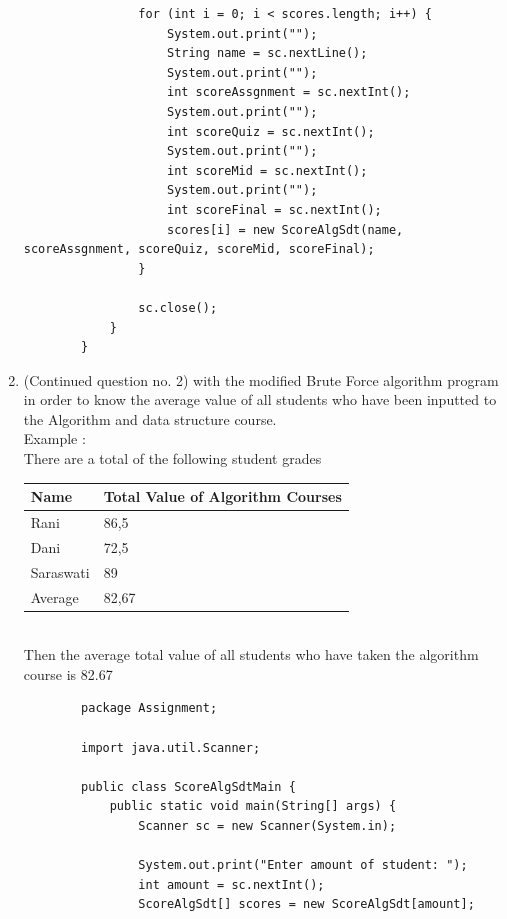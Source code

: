 \documentclass[12pt,titlepage]{article}
\begin{document}
\begin{enumerate}
\begin{verbatim}
                for (int i = 0; i < scores.length; i++) {
                    System.out.print("");
                    String name = sc.nextLine();
                    System.out.print("");
                    int scoreAssgnment = sc.nextInt();
                    System.out.print("");
                    int scoreQuiz = sc.nextInt();
                    System.out.print("");
                    int scoreMid = sc.nextInt();
                    System.out.print("");
                    int scoreFinal = sc.nextInt();
                    scores[i] = new ScoreAlgSdt(name, scoreAssgnment, scoreQuiz, scoreMid, scoreFinal);
                }

                sc.close();
            }
        }
    \end{verbatim}
    \item (Continued question no. 2) with the modified Brute Force algorithm program in order to know the average value of all students who have been inputted to the Algorithm and data structure course. \mbox{}\\
    Example : \mbox{}\\
    There are a total of the following student grades
    \mbox{}\\
    \begin{tabular}{|l|l|}
        \hline
        Name & Total Value of Algorithm Courses \\
        \hline
        Rani & 86,5 \\
        \hline
        Dani & 72,5 \\
        \hline
        Saraswati & 89 \\
        \hline
        Average & 82,67 \\
        \hline
    \end{tabular}
    \mbox{}\\
    Then the average total value of all students who have taken the algorithm course is 82.67
    \begin{verbatim}
        package Assignment;

        import java.util.Scanner;

        public class ScoreAlgSdtMain {
            public static void main(String[] args) {
                Scanner sc = new Scanner(System.in);

                System.out.print("Enter amount of student: ");
                int amount = sc.nextInt();
                ScoreAlgSdt[] scores = new ScoreAlgSdt[amount];


\end{verbatim}
\end{enumerate}
\end{document}
